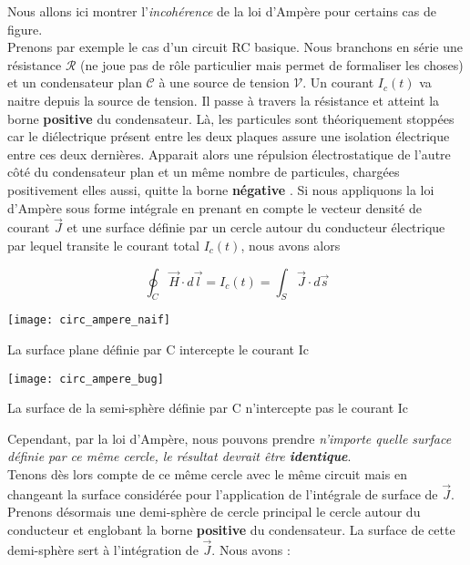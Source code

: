 Nous allons ici montrer l'\textit{incohérence} de la loi d'Ampère pour certains cas de figure. \\
Prenons par exemple  le cas d'un circuit RC basique. Nous branchons en série une résistance $\mathcal{R}$ (ne joue pas de rôle particulier mais permet de formaliser les choses) et un condensateur plan $\mathcal{C}$ à une source de tension $\mathcal{V}$. Un courant $I_{c}(t)$ va naitre depuis la source de tension. Il passe à travers la résistance et atteint la borne \textbf{positive} du condensateur. Là, les particules sont théoriquement stoppées car le diélectrique présent entre les deux plaques assure une isolation électrique entre ces deux dernières. Apparait alors une répulsion électrostatique de l'autre côté du condensateur plan  et un même nombre de particules, chargées positivement elles aussi, quitte la borne \textbf{négative} . Si nous appliquons la loi d'Ampère sous forme intégrale en prenant en compte le vecteur densité de courant $\vec{J}$ et une surface définie par un cercle autour du conducteur électrique par lequel transite le courant total $I_{c}(t)$, nous avons alors 

\[  \oint_{C} \vec{H} \cdot d\vec{l} = I_{c}(t) = \int_{S} \vec{J} \cdot d\vec{s} \]

\begin{marginfigure}[0cm]
	\texttt{[image: circ\_ampere\_naif]}
	\caption{La surface plane définie par C intercepte le courant Ic}
\end{marginfigure}
\begin{marginfigure}[0cm]
	\texttt{[image: circ\_ampere\_bug]}
	\caption{La surface de la semi-sphère définie par C n'intercepte pas le courant Ic}
\end{marginfigure}

Cependant, par la loi d'Ampère, nous pouvons prendre \textit{n'importe quelle surface définie par ce même cercle, le résultat devrait être \textbf{identique}}. \\
Tenons dès lors compte de ce même cercle avec le même circuit mais en changeant la surface considérée pour l'application de l'intégrale de surface de $\vec{J}$. 
Prenons désormais une demi-sphère de cercle principal le cercle autour du conducteur et englobant la borne \textbf{positive} du condensateur. La surface de cette demi-sphère sert
à l'intégration de $\vec{J}$. Nous avons : 

